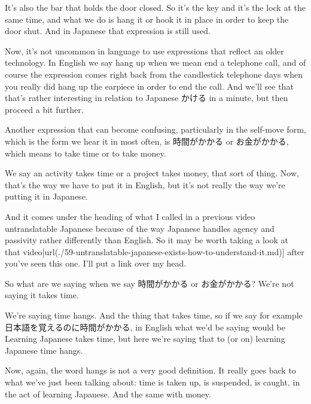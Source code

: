 It's also the bar that holds the door closed. So it's the key and it's the lock at the same time, and what we do is hang it or hook it in place in order to keep the door shut. And in Japanese that expression is still used.

Now, it's not uncommon in language to use expressions that reflect an older technology. In English we say hang up when we mean end a telephone call, and of course the expression comes right back from the candlestick telephone days when you really did hang up the earpiece in order to end the call. And we'll see that that's rather interesting in relation to Japanese かける in a minute, but then proceed a bit further.

\stopsectionlevel

\startsectionlevel[title={かかる},reference={かかる}]

Another expression that can become confusing, particularly in the self-move form, which is the form we hear it in most often, is 時間がかかる or お金がかかる, which means to take time or to take money.

{}

We say an activity takes time or a project takes money, that sort of thing. Now, that's the way we have to put it in English, but it's not really the way we're putting it in Japanese.

And it comes under the heading of what I called in a previous video untranslatable Japanese because of the way Japanese handles agency and passivity rather differently than English. So it may be worth taking a look at that video\goto{{[}59{]}}[url(./59-untranslatable-japanese-exists-how-to-understand-it.md)] after you've seen this one. I'll put a link over my head.

So what are we saying when we say 時間がかかる or お金がかかる? We're not saying it takes time.

We're saying time hangs. And the thing that takes time, so if we say for example 日本語を覚えるのに時間がかかる, in English what we'd be saying would be Learning Japanese takes time, but here we're saying that to (or on) learning Japanese time hangs.

{}

Now, again, the word hangs is not a very good definition. It really goes back to what we've just been talking about: time is taken up, is suspended, is caught, in the act of learning Japanese. And the same with money.

